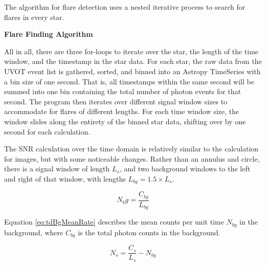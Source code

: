 \documentclass{article}
\begin{document}
\begin{multicols}{2}
The algorithm for flare detection uses a nested iterative process to search for flares in every star. 

\noindent\makebox[\linewidth]{\rule{\columnwidth}{0.4pt}} 
\textbf{Flare Finding Algorithm}

\begin{algorithmic}
        \ENDFOR
    \ENDFOR
\ENDFOR
\end{algorithmic}

\noindent\makebox[\linewidth]{\rule{\columnwidth}{0.4pt}}

All in all, there are three for-loops to iterate over the star, the length of the time window, and the timestamp in the star data. For each star, the raw data from the UVOT event list is gathered, sorted, and binned into an Astropy TimeSeries with a bin size of one second. That is, all timestamps within the same second will be summed into one bin containing the total number of photon events for that second. The program then iterates over different signal window sizes to accommodate for flares of different lengths. For each time window size, the window slides along the entirety of the binned star data, shifting over by one second for each calculation.

The SNR calculation over the time domain is relatively similar to the calculation for images, but with some noticeable changes. Rather than an annulus and circle, there is a signal window of length \(L_s\), and two background windows to the left and right of that window, with lengths \(L_{bg} = 1.5 \times L_s\). 

\begin{equation} \label{eq:tdBgMeanRate}
    N_bg = \frac{C_{bg}}{L_{bg}}
\end{equation}

Equation \ref{eq:tdBgMeanRate} describes the mean counts per unit time \(N_{bg}\) in the background, where \(C_{bg}\) is the total photon counts in the background. 

\begin{equation} \label{eq:tdSigMeanRate}
    N_s = \frac{C_s}{L_s} - N_{bg}
\end{equation}


\end{multicols}
\end{document}
